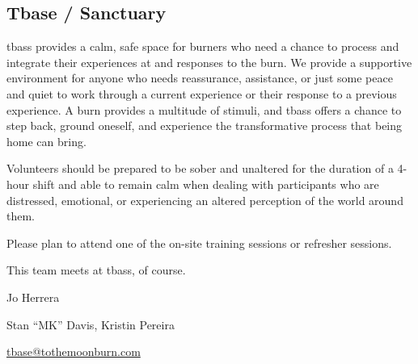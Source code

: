 \subsection*{Tbase / Sanctuary}

\Gls{tbass} provides a calm, safe space for burners who need a chance to process and integrate their experiences at and responses to the burn. We provide a supportive environment for anyone who needs reassurance, assistance, or just some peace and quiet to work through a current experience or their response to a previous experience. A burn provides a multitude of stimuli, and \gls{tbass}  offers a chance to step back, ground oneself, and experience the transformative process that being home can bring.

Volunteers should be prepared to be sober and unaltered for the duration of a 4-hour shift and able to remain calm when dealing with participants who are distressed, emotional, or experiencing an altered perception of the world around them. 


Please plan to attend one of the on-site training sessions or refresher sessions.

This team meets at \gls{tbass}, of course.

\begin{description}[leftmargin=6em,noitemsep,style=nextline]
   \item[Lead:] Jo Herrera
   \item[Co-leads:] Stan ``MK'' Davis, Kristin Pereira
   \item[Contact:] \url{tbase@tothemoonburn.com}
\end{description}


